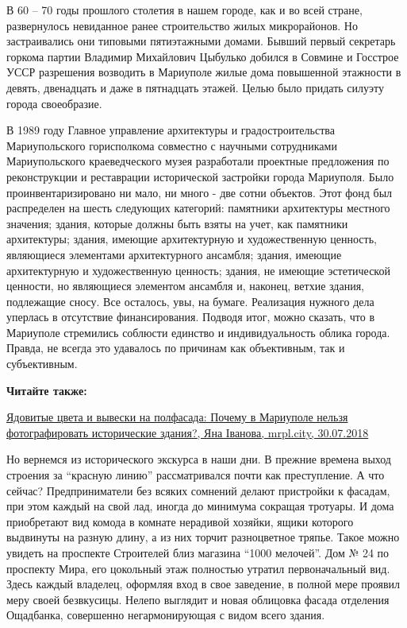 В 60 – 70 годы прошлого столетия в нашем городе, как и во всей стране,
развернулось невиданное ранее строительство жилых микрорайонов. Но
застраивались они типовыми пятиэтажными домами. Бывший первый секретарь горкома
партии Владимир Михайлович Цыбулько добился в Совмине и Госстрое УССР
разрешения возводить в Мариуполе жилые дома повышенной этажности в девять,
двенадцать и даже в пятнадцать этажей. Целью было придать силуэту города
своеобразие.

В 1989 году Главное управление архитектуры и градостроительства Мариупольского
горисполкома совместно с научными сотрудниками Мариупольского краеведческого
музея разработали проектные предложения по реконструкции и реставрации
исторической застройки города Мариуполя. Было проинвентаризировано ни мало, ни
много - две сотни объектов. Этот фонд был распределен на шесть следующих
категорий: памятники архитектуры местного значения; здания, которые должны быть
взяты на учет, как памятники архитектуры; здания, имеющие архитектурную и
художественную ценность, являющиеся элементами архитектурного ансамбля; здания,
имеющие архитектурную и художественную ценность; здания, не имеющие
эстетической ценности, но являющиеся элементом ансамбля и, наконец, ветхие
здания, подлежащие сносу. Все осталось, увы, на бумаге. Реализация нужного дела
уперлась в отсутствие финансирования. Подводя итог, можно сказать, что в
Мариуполе стремились соблюсти единство и индивидуальность облика города.
Правда, не всегда это удавалось по причинам как объективным, так и
субъективным.

\textbf{Читайте также:} 

\href{https://mrpl.city/news/view/yadovitye-tsveta-i-vyveski-na-polfasada-pochemu-v-mariupole-nelzya-fotografirovat-istoricheskie-zdaniya-foto}{Ядовитые цвета и вывески на полфасада: Почему в Мариуполе нельзя фотографировать исторические здания?, Яна Іванова, mrpl.city, 30.07.2018}

Но вернемся из исторического экскурса в наши дни. В прежние времена выход
строения за \enquote{красную линию} рассматривался почти как преступление. А что
сейчас? Предприниматели без всяких сомнений делают пристройки к фасадам, при
этом каждый на свой лад, иногда до минимума сокращая тротуары. И дома
приобретают вид комода в комнате нерадивой хозяйки, ящики которого выдвинуты на
разную длину, а из них торчит разноцветное тряпье. Такое можно увидеть на
проспекте Строителей близ магазина \enquote{1000 мелочей}. Дом № 24 по проспекту Мира,
его цокольный этаж полностью утратил первоначальный вид. Здесь каждый владелец,
оформляя вход в свое заведение, в полной мере проявил меру своей безвкусицы.
Нелепо выглядит и новая облицовка фасада отделения Ощадбанка, совершенно
негармонирующая с видом всего здания.

